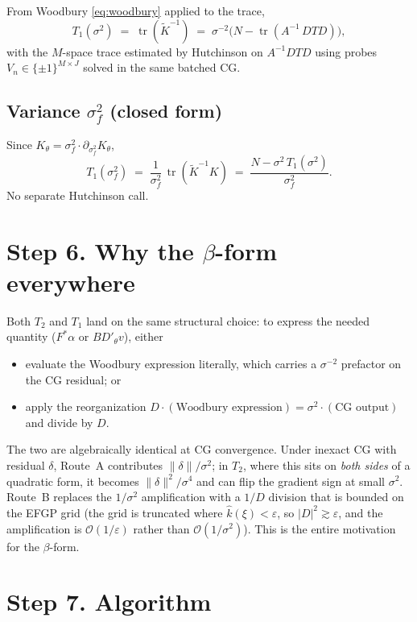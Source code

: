 \documentclass[11pt]{article}
\numberwithin{equation}{section}
\newcommand{\tr}{\operatorname{tr}}
\newcommand{\bigo}{\mathcal{O}}
\newcommand{\Ktil}{\widetilde K}
\newcommand{\Amean}{A}
\begin{document}
From Woodbury \eqref{eq:woodbury} applied to the trace,
\begin{equation}
  T_1(\sigma^2) \;=\; \tr(\Ktil^{-1})
           \;=\; \sigma^{-2}\bigl(N - \tr(\Amean^{-1}\,DTD)\bigr),
  \label{eq:T1noise}
\end{equation}
with the $M$-space trace estimated by Hutchinson on $\Amean^{-1}DTD$ using
probes $V_n\in\{\pm1\}^{M\times J}$ solved in the same batched CG.

\subsection*{Variance $\sigma_f^2$ (closed form)}

Since $K_\theta = \sigma_f^2\cdot\partial_{\sigma_f^2}K_\theta$,
\[
  T_1(\sigma_f^2) \;=\; \frac{1}{\sigma_f^2}\,\tr(\Ktil^{-1}K)
              \;=\; \frac{N - \sigma^2\,T_1(\sigma^2)}{\sigma_f^2}.
\]
No separate Hutchinson call.

\section{Step 6. Why the $\beta$-form everywhere}

Both $T_2$ and $T_1$ land on the same structural choice: to express the needed
quantity ($F^*\alpha$ or $BD'_\theta v$), either
\begin{itemize}
  \item[(A)] evaluate the Woodbury expression literally, which carries a
    $\sigma^{-2}$ prefactor on the CG residual; or
  \item[(B)] apply the reorganization $D\cdot(\text{Woodbury expression}) =
    \sigma^2\cdot(\text{CG output})$ and divide by $D$.
\end{itemize}
The two are algebraically identical at CG convergence. Under inexact CG with
residual $\delta$, Route~A contributes $\|\delta\|/\sigma^2$; in $T_2$, where
this sits on \emph{both sides} of a quadratic form, it becomes
$\|\delta\|^2/\sigma^4$ and can flip the gradient sign at small $\sigma^2$.
Route~B replaces the $1/\sigma^2$ amplification with a $1/D$ division that is
bounded on the EFGP grid (the grid is truncated where
$\hat k(\xi) < \varepsilon$, so $|D|^2 \gtrsim \varepsilon$, and the amplification
is $\bigo(1/\varepsilon)$ rather than $\bigo(1/\sigma^2)$).
This is the entire motivation for the $\beta$-form.

\section{Step 7. Algorithm}
\end{document}
